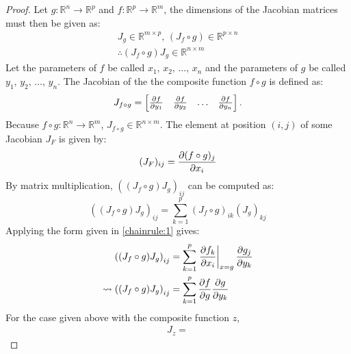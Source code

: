 \begin{proof}
	Let $g:\mathbb{R}^n\rightarrow\mathbb{R}^p$ and $f:\mathbb{R}^p\rightarrow\mathbb{R}^m$, the dimensions of the Jacobian matrices must then be given as:
	\begin{gather*}
		J_g\in\mathbb{R}^{m\times p},\,(J_f\circ g)\in\mathbb{R}^{p\times n}\\
		\therefore(J_f\circ g)J_g\in\mathbb{R}^{n\times m}
	\end{gather*}
	Let the parameters of $f$ be called $x_1,\,x_2,\,\hdots,\,x_n$ and the parameters of $g$ be called $y_1,\,y_2,\,\hdots,\,y_n$. The Jacobian of the the composite function $f\circ g$ is defined as:
	\begin{gather*}
		J_{f\circ g}=\begin{bmatrix}
			\pdv{f}{y_1}&\pdv{f}{y_2}&\hdots&\pdv{f}{y_n}
		\end{bmatrix}.
	\end{gather*}
	Because $f\circ g:\mathbb{R}^n\rightarrow\mathbb{R}^m$, $J_{f\circ g}\in\mathbb{R}^{n\times m}$. The element at position $(i,j)$ of some Jacobian $J_F$ is given by:
	\begin{equation}
		\label{chainrule:1}(J_F)_{ij}=\pdv{(f\circ g)_j}{x_i}\\
	\end{equation}
	By matrix multiplication, $((J_f\circ g)J_g)_{ij}$ can be computed as:
	$$
		\left((J_f\circ g)J_g\right)_{ij}=\sum_{k=1}^p(J_f\circ g)_{ik}(J_g)_{kj}
	$$
	Applying the form given in \ref{chainrule:1} gives:
	\begin{align}
		\notag\left((J_f\circ g)J_g\right)_{ij}&=\sum_{k=1}^p\eval{\pdv{f_k}{x_i}}_{x=g}\pdv{g_j}{y_k}\\
		\leadsto\left((J_f\circ g)J_g\right)_{ij}&=\sum_{k=1}^p\pdv{f}{g}\pdv{g}{y_k}\qedhere
	\end{align}
	For the case given above with the composite function $z$,
	\begin{align*}
		J_z=
	\end{align*}
\end{proof}

